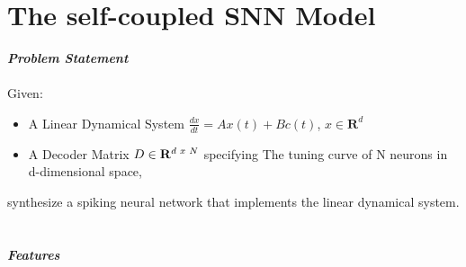 \section{The self-coupled SNN Model}

\textit{\textbf{Problem Statement}}
\\
\\
 Given:

\begin{itemize}
    \item A Linear Dynamical System  $\frac{dx}{dt} = A x(t) + B c(t)$,  $x \in \mathbf{R}^d$
    
    \item A Decoder Matrix $D \in \mathbf{R}^{d\hspace{1mm} x \hspace{1mm}N}$ specifying The tuning curve of N neurons in d-dimensional space,
    
\end{itemize}
synthesize a spiking neural network that implements the linear dynamical system.   
\\
\\
\\
\textbf{\textit{Features}}
\\
